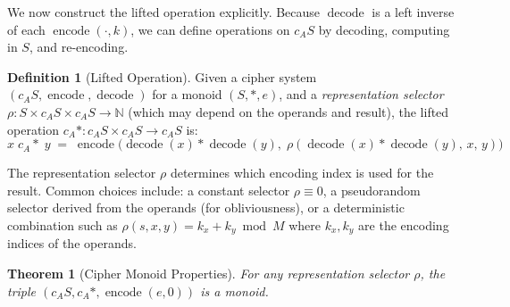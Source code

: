 \documentclass[11pt]{article}
\theoremstyle{definition}
\newtheorem{definition}{Definition}[section]
\theoremstyle{plain}
\newtheorem{theorem}{Theorem}[section]
\theoremstyle{remark}
\newcommand{\cipher}[1]{c_{#1}}
\newcommand{\encode}{\operatorname{encode}}
\newcommand{\decode}{\operatorname{decode}}
\begin{document}
We now construct the lifted operation explicitly. Because $\decode$ is a left inverse of each $\encode(\cdot, k)$, we can define operations on $\cipher{A}S$ by decoding, computing in $S$, and re-encoding.

\begin{definition}[Lifted Operation]
\label{def:lifted-op}
Given a cipher system $(\cipher{A}S, \encode, \decode)$ for a monoid $(S, *, e)$, and a \emph{representation selector} $\rho: S \times \cipher{A}S \times \cipher{A}S \to \mathbb{N}$ (which may depend on the operands and result), the lifted operation $\cipher{A}*: \cipher{A}S \times \cipher{A}S \to \cipher{A}S$ is:
$$x \;\cipher{A}*\; y \;=\; \encode\!\big(\decode(x) * \decode(y),\; \rho(\decode(x) * \decode(y),\, x,\, y)\big)$$
\end{definition}

The representation selector $\rho$ determines which encoding index is used for the result.  Common choices include: a constant selector $\rho \equiv 0$, a pseudorandom selector derived from the operands (for obliviousness), or a deterministic combination such as $\rho(s, x, y) = k_x + k_y \bmod M$ where $k_x, k_y$ are the encoding indices of the operands.

\begin{theorem}[Cipher Monoid Properties]
\label{thm:cipher-monoid}
For any representation selector $\rho$, the triple $(\cipher{A}S, \cipher{A}*, \encode(e,0))$ is a monoid.
\end{theorem}
\end{document}
